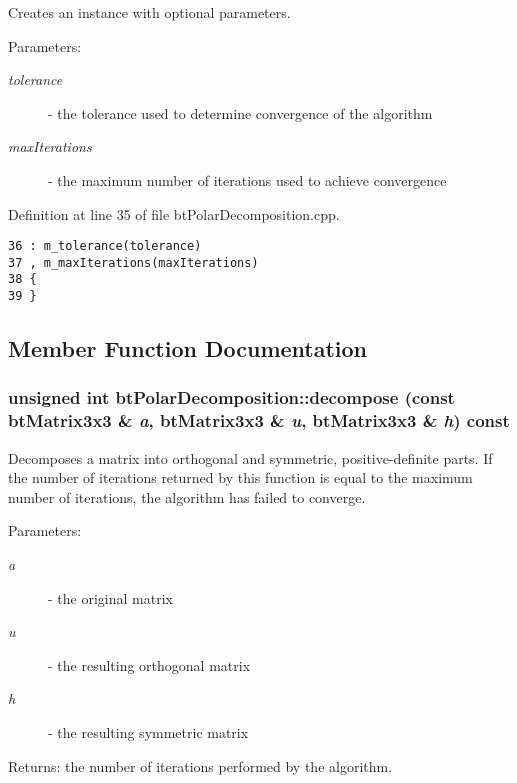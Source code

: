 Creates an instance with optional parameters.

\begin{Desc}
\item[Parameters:]
\begin{description}
\item[{\em tolerance}]- the tolerance used to determine convergence of the algorithm \item[{\em maxIterations}]- the maximum number of iterations used to achieve convergence \end{description}
\end{Desc}


Definition at line 35 of file btPolarDecomposition.cpp.

\begin{Code}\begin{verbatim}36 : m_tolerance(tolerance)
37 , m_maxIterations(maxIterations)
38 {
39 }
\end{verbatim}
\end{Code}




\subsection{Member Function Documentation}
\hypertarget{classbt_polar_decomposition_6ab0c88b30522ab42b6202a2f7a17eab}{
\subsubsection[decompose]{\setlength{\rightskip}{0pt plus 5cm}unsigned int btPolarDecomposition::decompose (const btMatrix3x3 \& {\em a}, \/  btMatrix3x3 \& {\em u}, \/  btMatrix3x3 \& {\em h}) const}}
\label{classbt_polar_decomposition_6ab0c88b30522ab42b6202a2f7a17eab}


Decomposes a matrix into orthogonal and symmetric, positive-definite parts. If the number of iterations returned by this function is equal to the maximum number of iterations, the algorithm has failed to converge.

\begin{Desc}
\item[Parameters:]
\begin{description}
\item[{\em a}]- the original matrix \item[{\em u}]- the resulting orthogonal matrix \item[{\em h}]- the resulting symmetric matrix\end{description}
\end{Desc}
\begin{Desc}
\item[Returns:]the number of iterations performed by the algorithm. \end{Desc}


